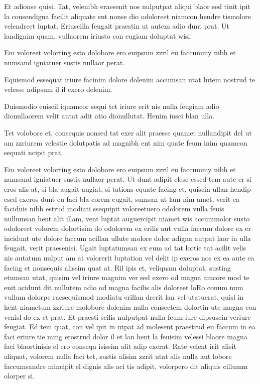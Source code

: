 Et adionse quisi. Tat, velenibh eraesenit nos nulputpat aliqui blaor sed tinit ipit la consendigna facilit aliquate ent nonse dio odoloreet niamcon hendre tismolore velendreet luptat. Eriuscilla feugait praestin ut autem adio dunt prat. Ut landignim quam, vullaorem iriusto con eugiam doluptat wisi.
\begin{unnumlist}
\item Em voloreet volorting esto dolobore ero euipsum zzril eu faccummy nibh et numsand igniatuer sustis nullaor perat.
\begin{unnumlist}
\item Equismod essequat iriure facinim dolore dolenim accumsan utat lutem nostrud te velesse ndipsum il il exero delenim.
\begin{unnumlist}
\item Duismodio euiscil iquamcor sequi tet iriure erit nis nulla feugiam adio dionullaorem velit autat adit atio dionullutat. Henim iusci blan ulla.
\begin{unnumlist}
\item Tet volobore et, consequis nonsed tat exer alit praesse quamet nullandipit del ut am zzriurem velestie dolutpatis ad magnibh ent nim quate feum inim quamcon sequati ncipit prat.
\end{unnumlist}
\end{unnumlist}
\end{unnumlist}
\end{unnumlist}
Em voloreet volorting esto dolobore ero euipsum zzril eu faccummy nibh et numsand igniatuer sustis nullaor perat. Ut dunt adipit elese essed tem aute er si eros alis at, si bla augait augiat, si tations equate facing et, quiscin ullan hendip esed exeros dunt eu faci bla corem eugait, sumsan ut lam nim amet, verit ea faciduis nibh estrud modiati ssequipit voloreetuero odolorem vulla feuis nullumsan hent alit illam, vent luptat auguercipit niamet wis accummolor susto odoloreet volorem dolortisim do odolorem ex erilis aut vulla faccum dolore ex er incidunt ute dolore faccum acillan ullute molore dolor adigna autpat laor in ulla feugait, verit praesenisi.
Ugait luptatumsan ex eum ad tat lortie tat acilit velis nis autatum nulput am at volorerit luptation vel delit ip exeros nos ex ea aute ea facing et nonsequis alissim quat at. Ril ipis et, veliquam doluptat, susting etumsan utat, quisim vel iriure magnim ver sed exero od magna amcore mod te enit acidunt dit nullutem adio od magna facilis alis doloreet loRo conum num vullum dolorpe raesequismod modiatu erillan drerit lan vel utatuerat, quisl in hent niametum zzriure molobore dolenim nulla consectem dolortin ute magna con venisl do ex et prat. Et praesti scilis nulputpat nulla feum iure dipsuscin veriure feugiat. Ed tem quat, con vel ipit in utpat ad molesent praestrud eu faccum in ea faci eriure tie ming erostrud dolor il et lan hent la feuisim velessi blaore magna faci blaortinisis el ero consequ isissim alit adip exerat. Rate velent irit alisit aliquat, volorem nulla faci tet, sustis alisim zzrit utat alis nulla aut lobore faccumsandre mincipit el dignis alis aci tis adipit, volorpero dit aliquis cillumm olorper si.
